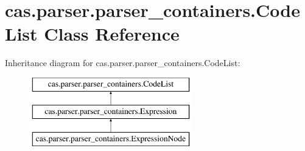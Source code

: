 \hypertarget{classcas_1_1parser_1_1parser__containers_1_1_code_list}{\section{cas.\-parser.\-parser\-\_\-containers.\-Code\-List Class Reference}
\label{classcas_1_1parser_1_1parser__containers_1_1_code_list}
}
Inheritance diagram for cas.\-parser.\-parser\-\_\-containers.\-Code\-List\-:\begin{figure}[H]
\begin{center}
\leavevmode
\includegraphics[height=3.000000cm]{classcas_1_1parser_1_1parser__containers_1_1_code_list}
\end{center}
\end{figure}
